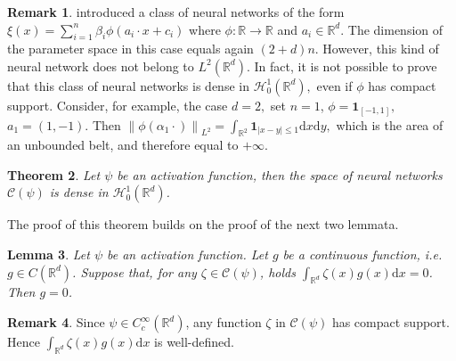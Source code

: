 \documentclass[11pt,a4paper,reqno]{amsart}
\numberwithin{equation}{section}
\theoremstyle{plain}
\newtheorem{theorem}{Theorem}[section]
\newtheorem{lemma}[theorem]{Lemma}
\theoremstyle{definition}
\newtheorem{remark}[theorem]{Remark}
\def\ud{\mathrm d}
\newcommand{\cH}{\mathcal{H}}
\newcommand{\R}{\mathbb{R}}
\newcommand{\norm}[1]{\left\|#1 \right\|} %
\newcommand{\abs}[1]{\left|#1\right|} %
\begin{document}
\begin{remark}\label{rem:hornik}
\citet{hornik1991approximation} introduced a class of neural networks of the form $\xi\left(x\right)=\sum_{i=1}^n \beta_i\phi \left( a_i\cdot x + c_i \right)$ where $\phi: \R \to \R$ and $a_i\in \R^d.$ 
The dimension of the parameter space in this case equals again $\left(2+d\right)n$.
However, this kind of neural network does not belong to $L^2(\R^d)$. 
In fact, it is not possible to prove that this class of neural networks is dense in $\cH_0^1 (\R^d),$ even if $\phi$ has compact support. 
Consider, for example, the case $d=2,$ set $n=1$, $\phi=\boldsymbol{1}_{\left[-1,1\right]},$ $a_1=\left(1,-1\right)$. 
Then $\norm{\phi\left(\alpha_1\cdot\right)}_{L^2}=\int_{\R^2}\boldsymbol{1}_{\abs{x-y}\le 1}\ud x \ud y,$ which is the area of an unbounded belt, and therefore equal to $+\infty.$ 
\end{remark}

\begin{theorem}
    \label{thm:neural app}
Let $\psi$ be an activation function, then the space of neural networks $\mathcal{C}\left(\psi\right)$ is dense in $\mathcal{H}_0^1 (\R^d)$. 
\end{theorem}

The proof of this theorem builds on the proof of the next two lemmata.

\begin{lemma}    \label{lem:1}
Let $\psi$ be an activation function. 
Let $g$ be a continuous function, \emph{i.e.} $g \in C (\R^d)$. 
Suppose that, for any $\zeta \in \mathcal{C}(\psi)$, holds $\int_{\R^d} \zeta (x) g (x) \ud x = 0$. 
Then $g = 0$. 
\end{lemma}

\begin{remark}
Since $\psi \in C^\infty_c (\R^d)$, any function $\zeta$ in $\mathcal{C} \left(\psi\right)$ has compact support. Hence $\int_{\R^d} \zeta (x) g (x) \ud x$ is well-defined. 
\end{remark}
\end{document}
